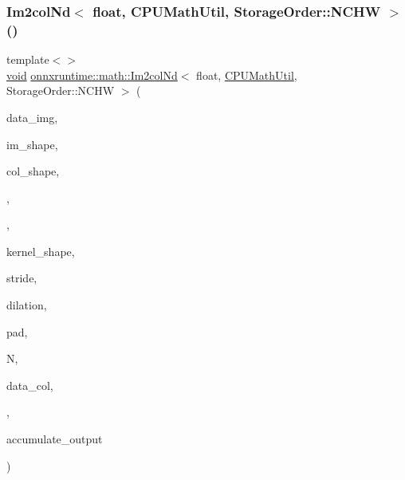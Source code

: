 \subsubsection{\texorpdfstring{Im2col\+Nd$<$ float, C\+P\+U\+Math\+Util, Storage\+Order\+::\+N\+C\+H\+W $>$()}{Im2colNd< float, CPUMathUtil, StorageOrder::NCHW >()}}
{\footnotesize\ttfamily template$<$$>$ \\
\mbox{\hyperlink{mlasi_8h_a88f941d423cb2a819b70a1358982b1a6}{void}} \mbox{\hyperlink{namespaceonnxruntime_1_1math_abf43727838ab5d569e1bc070bc23a166}{onnxruntime\+::math\+::\+Im2col\+Nd}}$<$ float, \mbox{\hyperlink{classonnxruntime_1_1CPUMathUtil}{C\+P\+U\+Math\+Util}}, Storage\+Order\+::\+N\+C\+HW $>$ (\begin{DoxyParamCaption}\item[{const float $\ast$}]{data\+\_\+img,  }\item[{const int64\+\_\+t $\ast$}]{im\+\_\+shape,  }\item[{const int64\+\_\+t $\ast$}]{col\+\_\+shape,  }\item[{const int64\+\_\+t}]{,  }\item[{const int64\+\_\+t}]{,  }\item[{const int64\+\_\+t $\ast$}]{kernel\+\_\+shape,  }\item[{const int64\+\_\+t $\ast$}]{stride,  }\item[{const int64\+\_\+t $\ast$}]{dilation,  }\item[{const int64\+\_\+t $\ast$}]{pad,  }\item[{const int64\+\_\+t}]{N,  }\item[{float $\ast$}]{data\+\_\+col,  }\item[{\mbox{\hyperlink{classonnxruntime_1_1CPUMathUtil}{C\+P\+U\+Math\+Util}} $\ast$}]{,  }\item[{bool}]{accumulate\+\_\+output }\end{DoxyParamCaption})}

\mbox{\label{namespaceonnxruntime_1_1math_a2d38d95ed202f752a4e714591df54858}} 
